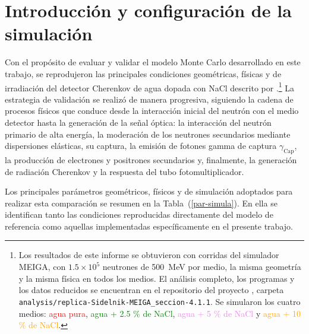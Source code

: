 \section{Introducción y configuración de la simulación}
\label{sec:Res-WCD-500MeV}

\noindent Con el propósito de evaluar y validar el modelo Monte Carlo desarrollado en este trabajo, se reprodujeron las principales condiciones geométricas, físicas y de irradiación del detector Cherenkov de agua dopada con NaCl descrito por \citet[Sec.~2, pp.~2217--2218, Fig.~1]{Sidelnik2020}.\footnote{Los resultados de este informe se obtuvieron con corridas del simulador MEIGA, con $1.5\times10^{5}$ neutrones de 500~MeV por medio, la misma geometría y la misma física en todos los medios. El análisis completo, los programas y los datos reducidos se encuentran en el repositorio del proyecto \citep{Betancourt2026WCDNaCl}, carpeta \texttt{analysis/replica-Sidelnik-MEIGA\_seccion-4.1.1}. Se simularon los cuatro medios: \textcolor{red}{agua pura}, \textcolor{green}{agua + 2.5 \% de NaCl}, \textcolor{violet}{agua + 5 \% de NaCl} y \textcolor{orange}{agua + 10 \% de NaCl}.} La estrategia de validación se realizó de manera progresiva, siguiendo la cadena de procesos físicos que conduce desde la interacción inicial del neutrón con el medio detector hasta la generación de la señal óptica: la interacción del neutrón primario de alta energía, la moderación de los neutrones secundarios mediante dispersiones elásticas, su captura, la emisión de fotones gamma de captura $\gamma_{\mathrm{Cap}}$, la producción de electrones y positrones secundarios y, finalmente, la generación de radiación Cherenkov y la respuesta del tubo fotomultiplicador.

Los principales parámetros geométricos, físicos y de simulación adoptados para realizar esta comparación se resumen en la Tabla~(\ref{par-simula}). En ella se identifican tanto las condiciones reproducidas directamente del modelo de referencia como aquellas implementadas específicamente en el presente trabajo.

